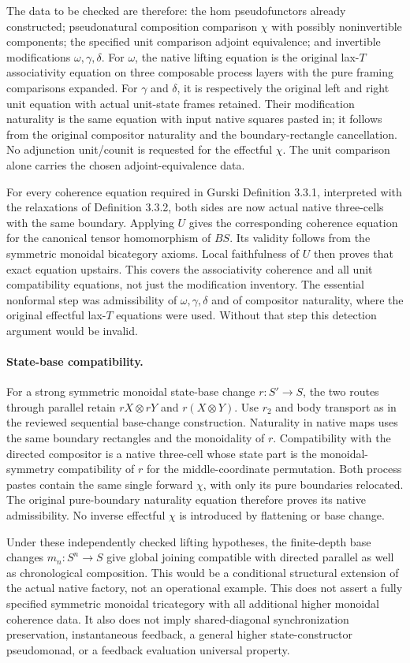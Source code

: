 \documentclass{article}
\begin{document}
The data to be checked are therefore: the hom pseudofunctors already constructed; pseudonatural composition comparison $\chi$ with possibly noninvertible components; the specified unit comparison adjoint equivalence; and invertible modifications $\omega,\gamma,\delta$. For $\omega$, the native lifting equation is the original lax-$T$ associativity equation on three composable process layers with the pure framing comparisons expanded. For $\gamma$ and $\delta$, it is respectively the original left and right unit equation with actual unit-state frames retained. Their modification naturality is the same equation with input native squares pasted in; it follows from the original compositor naturality and the boundary-rectangle cancellation. No adjunction unit/counit is requested for the effectful $\chi$. The unit comparison alone carries the chosen adjoint-equivalence data.

For every coherence equation required in Gurski Definition 3.3.1, interpreted with the relaxations of Definition 3.3.2, both sides are now actual native three-cells with the same boundary. Applying $U$ gives the corresponding coherence equation for the canonical tensor homomorphism of $BS$. Its validity follows from the symmetric monoidal bicategory axioms. Local faithfulness of $U$ then proves that exact equation upstairs. This covers the associativity coherence and all unit compatibility equations, not just the modification inventory. The essential nonformal step was admissibility of $\omega,\gamma,\delta$ and of compositor naturality, where the original effectful lax-$T$ equations were used. Without that step this detection argument would be invalid.

\paragraph{State-base compatibility.} For a strong symmetric monoidal state-base change $r:S'\to S$, the two routes through parallel retain $rX\otimes rY$ and $r(X\otimes Y)$. Use $r_2$ and body transport as in the reviewed sequential base-change construction. Naturality in native maps uses the same boundary rectangles and the monoidality of $r$. Compatibility with the directed compositor is a native three-cell whose state part is the monoidal-symmetry compatibility of $r$ for the middle-coordinate permutation. Both process pastes contain the same single forward $\chi$, with only its pure boundaries relocated. The original pure-boundary naturality equation therefore proves its native admissibility. No inverse effectful $\chi$ is introduced by flattening or base change.

Under these independently checked lifting hypotheses, the finite-depth base changes $m_n:S^n\to S$ give global joining compatible with directed parallel as well as chronological composition. This would be a conditional structural extension of the actual native factory, not an operational example. This does not assert a fully specified symmetric monoidal tricategory with all additional higher monoidal coherence data. It also does not imply shared-diagonal synchronization preservation, instantaneous feedback, a general higher state-constructor pseudomonad, or a feedback evaluation universal property.
\end{document}
